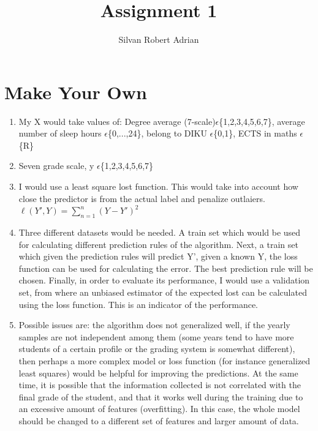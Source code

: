 \documentclass[a4paper]{article}
\title{\vspace{-5cm} Assignment 1}
\author{Silvan Robert Adrian}
\begin{document}
\maketitle

\tableofcontents

\section{Make Your Own}

\begin{enumerate}
  \item My X would take values of: Degree average (7-scale)$\epsilon$\{1,2,3,4,5,6,7\}, average number of sleep hours $\epsilon$\{0,...,24\}, belong to DIKU $\epsilon$\{0,1\}, ECTS in maths $\epsilon$\{R\}
  \item Seven grade scale, y $\epsilon$\{1,2,3,4,5,6,7\}
  \item I would use a least square lost function. This would take into account how close the predictor is from the actual label and penalize outlaiers. $ \ell(Y',Y) = \sum_{n=1}^{n}(Y-Y')^{2}$
  \item Three different datasets would be needed. A train set which would be used for calculating different prediction rules of the algorithm. Next, a train set which given the prediction rules will predict Y', given a known Y, the loss function can be used for calculating the error. The best prediction rule will be chosen. Finally, in order to evaluate its performance, I would use a validation set, from where an unbiased estimator of the expected lost can be calculated using the loss function. This is an indicator of the performance. 
  \item Possible issues are: the algorithm does not generalized well, if the yearly samples are not independent among them (some years tend to have more students of a certain profile or the grading system is somewhat different), then perhaps a more complex model or loss function (for instance generalized least squares) would be helpful for improving the predictions. At the same time, it is possible that the information collected is not correlated with the final grade of the student, and that it works well during the training due to an excessive amount of features (overfitting). In this case, the whole model should be changed to a different set of features and larger amount of data.

\end{enumerate}
\end{document}
